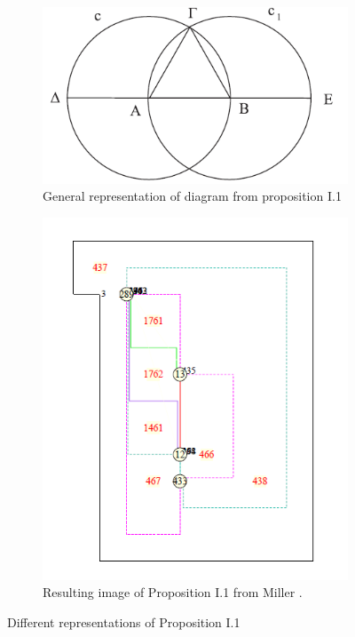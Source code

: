 \documentclass[]{interact}
\theoremstyle{plain}
\theoremstyle{definition}
\theoremstyle{remark}
\begin{document}
\begin{figure}[t]
  \centering
  \begin{subfigure}[b]{0.3\textwidth}
    \includegraphics[width=\textwidth]{euclid-I1}
    \caption{General representation of diagram from proposition I.1}
  \end{subfigure}
  \hfil
  \begin{subfigure}[b]{0.3\textwidth}
    \includegraphics[width=\textwidth]{miller-fig320-I1}
    \caption{Resulting image of Proposition I.1 from Miller \cite{Miller2001ADF}.}
  \end{subfigure}
  
  \caption{Different representations of Proposition I.1}
  \label{fig:milleri1}
\end{figure}
\end{document}
